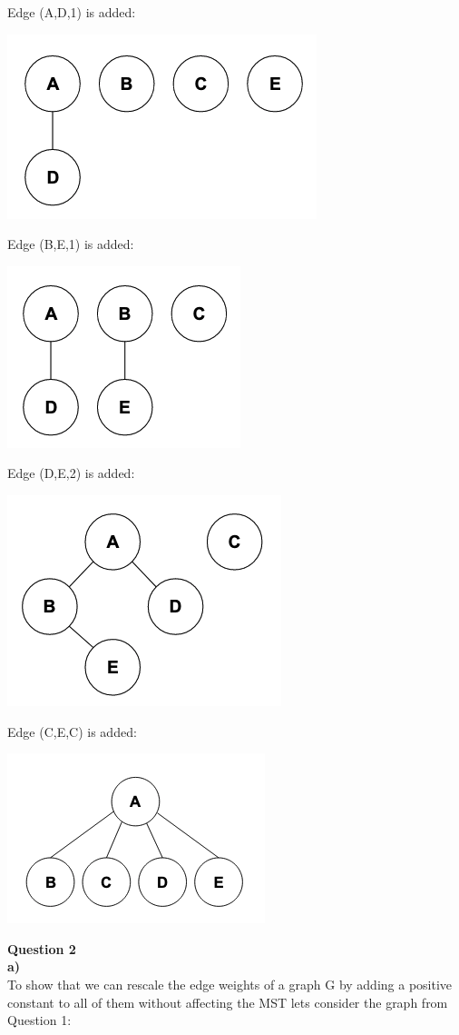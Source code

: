 \documentclass{article}
\begin{document}
Edge (A,D,1) is added:
\begin{center}
    \includegraphics[width=.35\textwidth]{1b-2.png}
\end{center}

Edge (B,E,1) is added:
\begin{center}
    \includegraphics[width=.3\textwidth]{1b-3.png}
\end{center}

Edge (D,E,2) is added:
\begin{center}
    \includegraphics[width=.35\textwidth]{1b-4.png}
\end{center}

Edge (C,E,C) is added:
\begin{center}
    \includegraphics[width=.35\textwidth]{1b-5.png}
\end{center}

{\bf Question 2}\\
{\bf a)}\\
To show that we can rescale the edge weights of a graph G by adding a positive constant to all of them without affecting the MST lets consider the graph from Question 1:
\end{document}
